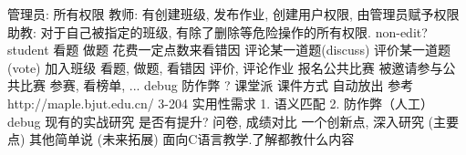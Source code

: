 {}\markdownRendererInterblockSeparator
{}\markdownRendererUlBeginTight
\markdownRendererUlItem 管理员: 所有权限\markdownRendererUlItemEnd 
\markdownRendererUlItem 教师: 有创建班级, 发布作业, 创建用户权限, 由管理员赋予权限\markdownRendererUlItemEnd 
\markdownRendererUlItem 助教: 对于自己被指定的班级, 有除了删除等危险操作的所有权限.\markdownRendererUlItemEnd 
\markdownRendererUlItem non-edit?\markdownRendererUlItemEnd 
\markdownRendererUlItem student\markdownRendererUlItemEnd 
\markdownRendererUlEndTight \markdownRendererInterblockSeparator
{}\markdownRendererInterblockSeparator
{}\markdownRendererInterblockSeparator
{}\markdownRendererUlBeginTight
\markdownRendererUlItem 看题\markdownRendererUlItemEnd 
\markdownRendererUlItem 做题\markdownRendererUlItemEnd 
\markdownRendererUlItem 花费一定点数来看错因\markdownRendererUlItemEnd 
\markdownRendererUlItem 评论某一道题(discuss)\markdownRendererUlItemEnd 
\markdownRendererUlItem 评价某一道题(vote)\markdownRendererUlItemEnd 
\markdownRendererUlEndTight \markdownRendererInterblockSeparator
{}\markdownRendererInterblockSeparator
{}\markdownRendererUlBeginTight
\markdownRendererUlItem 加入班级\markdownRendererUlItemEnd 
\markdownRendererUlItem 看题, 做题, 看错因\markdownRendererUlItemEnd 
\markdownRendererUlItem 评价, 评论作业\markdownRendererUlItemEnd 
\markdownRendererUlItem \markdownRendererUlItemEnd 
\markdownRendererUlEndTight \markdownRendererInterblockSeparator
{}\markdownRendererInterblockSeparator
{}\markdownRendererUlBeginTight
\markdownRendererUlItem 报名公共比赛\markdownRendererUlItemEnd 
\markdownRendererUlItem 被邀请参与公共比赛\markdownRendererUlItemEnd 
\markdownRendererUlItem 参赛, 看榜单, ...\markdownRendererUlItemEnd 
\markdownRendererUlEndTight \markdownRendererInterblockSeparator
{}\markdownRendererInterblockSeparator
{}debug 防作弊 ? 课堂派 课件方式 自动放出 参考  http://maple.bjut.edu.cn/ 3-204\markdownRendererInterblockSeparator
{}实用性需求 1. 语义匹配 2. 防作弊（人工）\markdownRendererInterblockSeparator
{}debug\markdownRendererInterblockSeparator
{}现有的实战研究 是否有提升?\markdownRendererInterblockSeparator
{}问卷, 成绩对比\markdownRendererInterblockSeparator
{}一个创新点, 深入研究 (主要点) 其他简单说 (未来拓展)\markdownRendererInterblockSeparator
{}面向C语言教学.了解都教什么内容\markdownRendererInterblockSeparator
